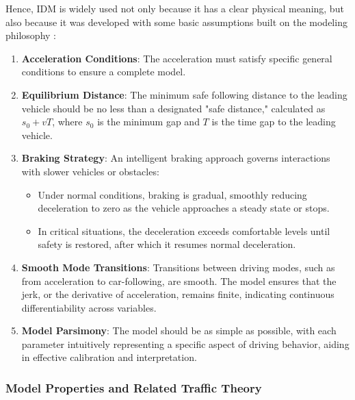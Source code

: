 \documentclass[a4paper,fleqn]{cas-sc}
\begin{document}
Hence, IDM is widely used not only because it has a clear physical meaning, but also because it was developed with some basic assumptions built on the modeling philosophy \citep{treiberTrafficFlowDynamics2013}:

\begin{enumerate}
    \item \textbf{Acceleration Conditions}: The acceleration must satisfy specific general conditions to ensure a complete model.

    \item \textbf{Equilibrium Distance}: The minimum safe following distance to the leading vehicle should be no less than a designated "safe distance," calculated as $s_0 + vT$, where $s_0$ is the minimum gap and $T$ is the time gap to the leading vehicle.

    \item \textbf{Braking Strategy}: An intelligent braking approach governs interactions with slower vehicles or obstacles:
    \begin{itemize}
        \item Under normal conditions, braking is gradual, smoothly reducing deceleration to zero as the vehicle approaches a steady state or stops.
        \item In critical situations, the deceleration exceeds comfortable levels until safety is restored, after which it resumes normal deceleration.
    \end{itemize}

    \item \textbf{Smooth Mode Transitions}: Transitions between driving modes, such as from acceleration to car-following, are smooth. The model ensures that the jerk, or the derivative of acceleration, remains finite, indicating continuous differentiability across variables.

    \item \textbf{Model Parsimony}: The model should be as simple as possible, with each parameter intuitively representing a specific aspect of driving behavior, aiding in effective calibration and interpretation.
\end{enumerate}




\subsubsection{Model Properties and Related Traffic Theory}
\end{document}
